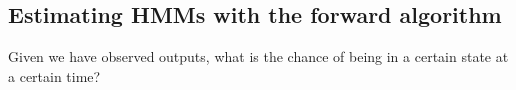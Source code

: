 
\subsection{Estimating HMMs with the forward algorithm}

Given we have observed outputs, what is the chance of being in a certain state at a certain time?

